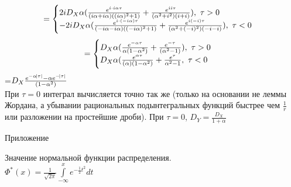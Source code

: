 \documentclass[russian, 12pt, fleqn]{article}
\begin{document}
\\
\noindent
\begin{equation*}
\noindent= 
 \begin{cases}
2iD_X\alpha (\frac{e^{i \cdot i \alpha \tau}}{(i\alpha + i \alpha)((i\alpha )^2 + 1)} + \frac{e^{ii\tau}}{(\alpha^2 + i^2)(i + i)}),\ \tau > 0\\
-2iD_X\alpha (\frac{e^{i \cdot(- i \alpha) \tau}}{(-i\alpha - i \alpha)((-i\alpha )^2 + 1)} + \frac{e^{i(-i)\tau}}{(\alpha^2 + (-i)^2)(-i - i)}),\ \tau < 0\\
 \end{cases}
\end{equation*}
\noindent
\begin{equation*}
\noindent= 
 \begin{cases}
D_X \alpha (\frac{e^{-\alpha \tau}}{\alpha (1 - \alpha ^ 2)} + \frac{e^{-\tau}}{(\alpha ^ 2 - 1)}),\ \tau > 0\\
D_X\alpha (\frac{e^{\alpha \tau}}{(\alpha)(1 - \alpha^2) } +  \frac{e^{\tau}}{\alpha^2 - 1},\ \tau < 0\\
 \end{cases}
\end{equation*}
=$D_X \frac{e^{-\alpha \abs{\tau}} - \alpha e^{-\abs{\tau}}}{(1 - \alpha^2)}$\\
При $\tau = 0$ интеграл вычисляется точно так же (только на основании не леммы Жордана, а убывании рациональных подынтегральных функций быстрее чем $\frac{1}{r}$ или разложении на простейшие дроби). При $\tau = 0 $, $D_Y = \frac{D_X}{1 + \alpha}$\\
\newpage
\begin{center}
$\textbf{Приложение}$
\end{center}
\begin{center}
Значение нормальной функции распределения.\\
$\Phi^*(x) = \frac{1}{\sqrt{2\pi} } \displaystyle{\int \limits_{-\infty}^{x}} e^{-\frac{1}{2}t^2} dt$\\
\end{center}
\end{document}
